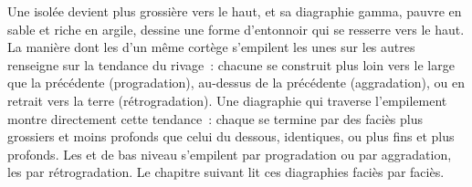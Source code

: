 Une  isolée devient plus grossière vers le haut, et sa diagraphie gamma, pauvre en sable
et riche en argile, dessine une forme d'entonnoir qui se resserre vers le haut. La manière dont les
 d'un même cortège s'empilent les unes sur les autres renseigne sur la tendance du rivage~:
chacune se construit plus loin vers le large que la précédente (progradation),
au-dessus de la précédente (aggradation), ou en retrait vers la terre (rétrogradation). Une diagraphie
qui traverse l'empilement montre directement cette tendance~: chaque  se termine par des faciès plus grossiers
et moins profonds que celui du dessous, identiques, ou plus fins et plus profonds.
Les  et de bas niveau s'empilent par progradation ou par aggradation,
les  par rétrogradation. Le chapitre suivant lit
ces diagraphies faciès par faciès.

